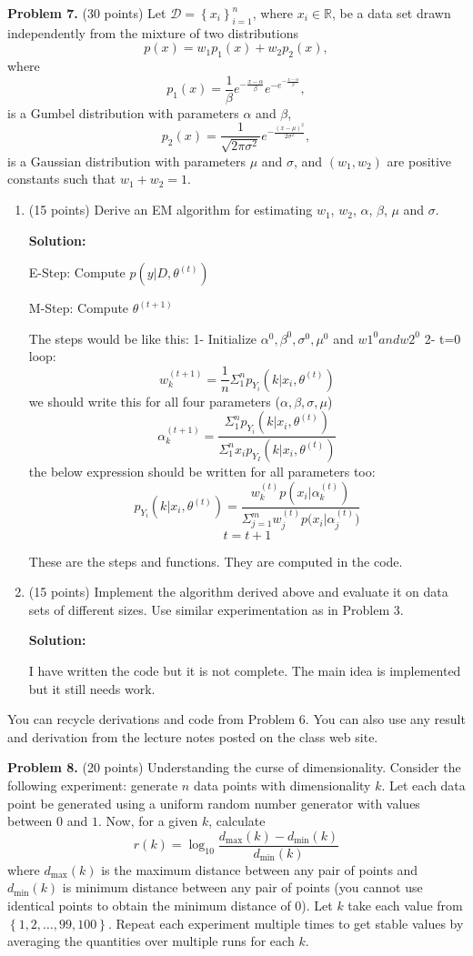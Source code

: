 \documentclass[twoside]{article}
\begin{document}

\textbf{Problem 7.} (30 points)  Let $\mathcal{D}=\left\{ x_{i}\right\} _{i=1}^{n}$, where $x_i \in \mathbb{R}$, be a data set drawn independently from the mixture of two distributions
\[
p(x)=w_{1}p_{1}(x)+w_{2}p_{2}(x),
\]
where 
\[
p_{1}(x)=\frac{1}{\beta}e^{-\frac{x-\alpha}{\beta}}e^{-e^{-\frac{x-\alpha}{\beta}}},
\]
is a Gumbel distribution with parameters $\alpha$ and $\beta$, 
\[
p_{2}(x)=\frac{1}{\sqrt{2\pi\sigma^{2}}}e^{-\frac{(x-\mu)^{2}}{2\sigma^{2}}},
\]
is a Gaussian distribution with parameters $\mu$ and $\sigma$, and $(w_{1},w_{2})$ are positive constants such that $w_{1}+w_{2}=1$.
\begin{enumerate}
\item (15 points) Derive an EM algorithm for estimating $w_1$, $w_2$, $\alpha$, $\beta$, $\mu$ and $\sigma$.

\textbf{Solution:}

E-Step: Compute $p(y|D, \theta^{(t)})$

M-Step: Compute $\theta^{(t+1)}$


The steps would be like this:
1- Initialize $\alpha^0, \beta^0, \sigma^0, \mu^0$ and $w1^0 and w2^0$
2- t=0
loop:
\[
w_k^{(t+1)} = \frac{1}{n} \Sigma_1^n{p_{Y_i}(k|x_i, \theta^{(t)})}
\]
we should write this for all four parameters ($\alpha, \beta, \sigma, \mu$)
\[
\alpha_k^{(t+1)} = \frac{ \Sigma_1^n{p_{Y_i}(k|x_i, \theta^{(t)}) } }
{\Sigma_1^n{x_i p_{Y_I} (k|x_i, \theta^{(t)}) }}
\]
the below expression should be written for all parameters too:
\[
p_{Y_i}(k|x_i, \theta^{(t)}) = \frac{w_k^{(t)} p(x_i|\alpha_k^{(t)})}
{\Sigma_{j=1}^m{w_j^{(t)} p(x_i|\alpha_j^{(t)} })}
\]
\[t=t+1\]

These are the steps and functions. They are computed in the code.

\item (15 points) Implement the algorithm derived above and evaluate it on data sets of different sizes. Use similar experimentation as in Problem 3.

\textbf{Solution:}

I have written the code but it is not complete. The main idea is implemented but it still needs work.
\end{enumerate}
You can recycle derivations and code from Problem 6. You can also use any result and derivation from the lecture notes posted on the class web site.

\textbf{Problem 8.} (20 points) Understanding the curse of dimensionality. Consider the following experiment: generate $n$ data points with dimensionality $k$. Let each data point be generated using a uniform random number generator with values between $0$ and $1$. Now, for a given $k$, calculate
\[
r(k)=\log_{10}\frac{d_{\max}(k)-d_{\min}(k)}{d_{\min}(k)}
\]
\noindent where $d_{\max}(k)$ is the maximum distance between any pair of points and $d_{\min}(k)$ is minimum distance between any pair of points (you cannot use identical points to obtain the minimum distance of 0). Let $k$ take each value from $\left\{ 1,2,\ldots,99,100\right\}$. Repeat each experiment multiple times to get stable values by averaging the quantities over multiple runs for each $k$. 
\end{document}
